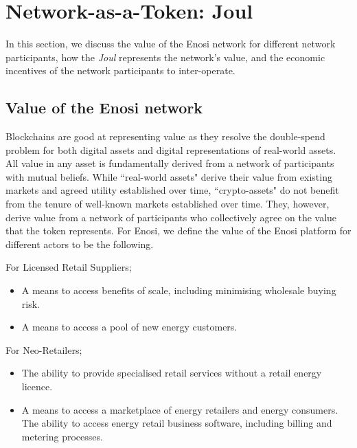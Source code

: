 \documentclass[a4paper,12pt,reqno]{amsart}
\theoremstyle{definition}
\begin{document}
\newpage
\enlargethispage{-1\baselineskip}

\section{Network-as-a-Token: Joul}
In this section, we discuss the value of the Enosi network for different network participants, how the \textit{Joul} represents the network's value, and the economic incentives of the network participants to inter-operate. 

\subsection*{Value of the Enosi network} Blockchains are good at representing value as they resolve the double-spend problem for both digital assets and digital representations of real-world assets. All value in any asset is fundamentally derived from a network of participants with mutual beliefs. While ``real-world assets" derive their value from existing markets and agreed utility established over time, ``crypto-assets" do not benefit from the tenure of well-known markets established over time. They, however, derive value from a network of participants who collectively agree on the value that the token represents. For Enosi, we define the value of the Enosi platform for different actors to be the following.
\vspace{+1em}

\noindent For Licensed Retail Suppliers;
\begin{itemize}
\item{A means to access benefits of scale, including minimising wholesale buying risk.}
\item{A means to access a pool of new energy customers.\\}
\end{itemize}
\vspace{-1.5em}

\noindent For Neo-Retailers;
\begin{itemize}
\item{The ability to provide specialised retail services without a retail energy licence.}
\item{A means to access a marketplace of energy retailers and energy consumers.
The ability to access energy retail business software, including billing and metering processes.\\}
\end{itemize}
\vspace{-1.5em}
\end{document}
